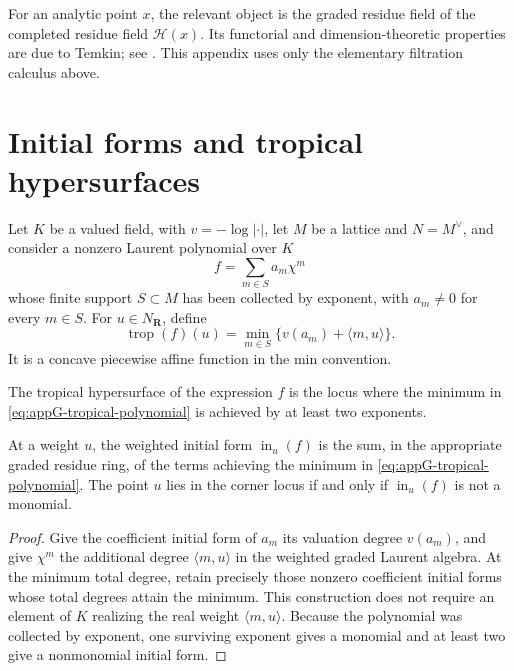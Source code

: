 For an analytic point \(x\), the relevant object is the graded residue field
of the completed residue field \(\mathcal H(x)\).
Its functorial and dimension-theoretic properties are due to Temkin; see
\cite{Temkin2004}.
This appendix uses only the elementary filtration calculus above.

\section{Initial forms and tropical hypersurfaces}
\label{sec:appG-initial-tropical}

Let \(K\) be a valued field, with \(v=-\log|\cdot|\), let \(M\) be a
lattice and \(N=M^\vee\), and consider a nonzero Laurent polynomial over \(K\)
\[
                              f=\sum_{m\in S}a_m\chi^m
\tag{G.17}\label{eq:appG-laurent}
\]
whose finite support \(S\subset M\) has been collected by exponent, with
\(a_m\neq0\) for every \(m\in S\).
For \(u\in N_{\mathbf R}\), define
\[
 \operatorname{trop}(f)(u)
 =
 \min_{m\in S}\{v(a_m)+\langle m,u\rangle\}.
\tag{G.18}\label{eq:appG-tropical-polynomial}
\]
It is a concave piecewise affine function in the min convention.

\begin{definition}
\label{def:appG-corner-locus}
The tropical hypersurface of the expression \(f\) is the locus where the
minimum in \eqref{eq:appG-tropical-polynomial} is achieved by at least two
exponents.
\end{definition}

\begin{proposition}\label{prop:appG-initial-form-test}
At a weight \(u\), the weighted initial form
\(\operatorname{in}_u(f)\) is the sum, in the appropriate graded residue
ring, of the terms achieving the minimum in
\eqref{eq:appG-tropical-polynomial}.
The point \(u\) lies in the corner locus if and only if
\(\operatorname{in}_u(f)\) is not a monomial.
\end{proposition}

\begin{proof}
Give the coefficient initial form of \(a_m\) its valuation degree
\(v(a_m)\), and give \(\chi^m\) the additional degree
\(\langle m,u\rangle\) in the weighted graded Laurent algebra.
At the minimum total degree, retain precisely those nonzero coefficient
initial forms whose total degrees attain the minimum.
This construction does not require an element of \(K\) realizing the
real weight \(\langle m,u\rangle\).
Because the polynomial was collected by exponent, one surviving exponent
gives a monomial and at least two give a nonmonomial initial form.
\end{proof}

